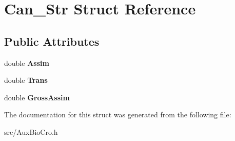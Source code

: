 \hypertarget{struct_can___str}{\section{Can\-\_\-\-Str Struct Reference}
\label{struct_can___str}
}
\subsection*{Public Attributes}
\begin{DoxyCompactItemize}
\item 
\hypertarget{struct_can___str_af806a0ccf68200e30014c08ed1a903ed}{double {\bfseries Assim}}\label{struct_can___str_af806a0ccf68200e30014c08ed1a903ed}

\item 
\hypertarget{struct_can___str_ad5736ba1b59e0cf2eaf9171cc8e2377f}{double {\bfseries Trans}}\label{struct_can___str_ad5736ba1b59e0cf2eaf9171cc8e2377f}

\item 
\hypertarget{struct_can___str_a9559feead5bceed9c242fc758416f502}{double {\bfseries Gross\-Assim}}\label{struct_can___str_a9559feead5bceed9c242fc758416f502}

\end{DoxyCompactItemize}


The documentation for this struct was generated from the following file\-:\begin{DoxyCompactItemize}
\item 
src/Aux\-Bio\-Cro.\-h\end{DoxyCompactItemize}
